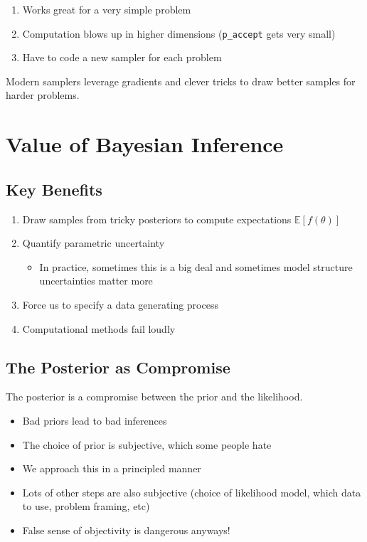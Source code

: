 \documentclass[
  letterpaper,
  DIV=11,
  numbers=noendperiod]{scrreprt}
\providecommand{\tightlist}{%
  \setlength{\itemsep}{0pt}\setlength{\parskip}{0pt}}
\begin{document}
\begin{enumerate}
\def\labelenumi{\arabic{enumi}.}
\tightlist
\item
  Works great for a very simple problem
\item
  Computation blows up in higher dimensions (\texttt{p\_accept} gets
  very small)
\item
  Have to code a new sampler for each problem
\end{enumerate}

Modern samplers leverage gradients and clever tricks to draw better
samples for harder problems.

\section{Value of Bayesian Inference}\label{value-of-bayesian-inference}

\subsection{Key Benefits}\label{key-benefits}

\begin{enumerate}
\def\labelenumi{\arabic{enumi}.}
\tightlist
\item
  Draw samples from tricky posteriors to compute expectations
  \(\mathbb{E}[f(\theta)]\)
\item
  Quantify parametric uncertainty

  \begin{itemize}
  \tightlist
  \item
    In practice, sometimes this is a big deal and sometimes model
    structure uncertainties matter more
  \end{itemize}
\item
  Force us to specify a data generating process
\item
  Computational methods fail loudly
\end{enumerate}

\subsection{The Posterior as
Compromise}\label{the-posterior-as-compromise}

The posterior is a compromise between the prior and the likelihood.

\begin{itemize}
\tightlist
\item
  Bad priors lead to bad inferences
\item
  The choice of prior is subjective, which some people hate
\item
  We approach this in a principled manner
\item
  Lots of other steps are also subjective (choice of likelihood model,
  which data to use, problem framing, etc)
\item
  False sense of objectivity is dangerous anyways!
\end{itemize}
\end{document}
